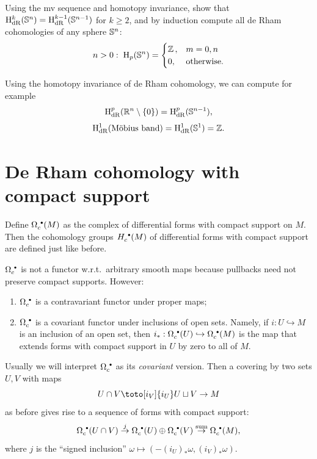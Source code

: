 \begin{xca}
    Using the \gls{mv} sequence and homotopy invariance, show that $\mathrm{H}_{\rm dR}^k(\mathbb{S}^n)=\mathrm{H}_{\rm dR}^{k-1}(\mathbb{S}^{n-1})$ for $k\geq 2$, and by induction compute all de Rham cohomologies of any sphere $\mathbb{S}^n$:
    \[n>0:\; \mathrm{H}_p(\mathbb{S}^n)=\begin{cases} \mathbb{Z}\,, & m=0,n\\ 0, & \text{otherwise.}\end{cases}\]
\end{xca}


\begin{xca}
    Using the homotopy invariance of de Rham cohomology, we can compute for example
    \[\mathrm{H}^p_{\rm dR}(\mathbb{R}^n\setminus\{0\})=\mathrm{H}^p_{\rm dR}(\mathbb{S}^{n-1}),\]
    \[\mathrm{H}^1_{\rm dR}(\text{M\"obius band})=\mathrm{H}^1_{\rm dR}(\mathbb{S}^1)=\mathbb{Z}.\]
\end{xca}

\section{De Rham cohomology with compact support}

\begin{defn}
    Define $\Omega_c^{\smbullet }(M)$ as the complex of differential forms with compact support on $M$. Then the cohomology groups $H_c^{\smbullet }(M)$ of differential forms with compact support are defined just like before.
\end{defn}

\begin{prop}
    $\Omega_c^{\smbullet }$ is not a functor w.r.t.\ arbitrary smooth maps because pullbacks need not preserve compact supports. However:
    \begin{enumerate}
        \item $\Omega_c^{\smbullet }$ is a contravariant functor under proper maps;
        \item $\Omega_c^{\smbullet }$ is a covariant functor under inclusions of open sets. Namely, if $i:U\hookrightarrow M$ is an inclusion of an open set, then $i_\ast:\Omega_c^{\smbullet }(U)\hookrightarrow\Omega_c^{\smbullet }(M)$ is the map that extends forms with compact support in $U$ by zero to all of $M$.
    \end{enumerate}
\end{prop}
Usually we will interpret $\Omega_c^{\smbullet }$ as its \emph{covariant} version. Then a covering by two sets $U,V$ with maps 
\[U\cap V\toto[i_V]{i_U}U\sqcup V\to M \]
as before gives rise to a sequence of forms with compact support:
\[\Omega_c^{\smbullet }(U\cap V)\overset{j}{\to} \Omega_c^{\smbullet }(U)\oplus\Omega_c^{\smbullet }(V)\overset{\text{sum}}\to \Omega_c^{\smbullet} (M) ,\]
where $j$ is the ``signed inclusion'' $\omega\mapsto \left(-(i_U)_\ast \omega,(i_V)_\ast\omega\right)$.


